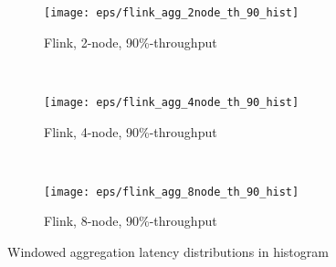 \begin{figure*}
    \begin{subfigure}[b]{0.3\textwidth}
        \texttt{[image: eps/flink\_agg\_2node\_th\_90\_hist]}

        \caption{Flink, 2-node,  90\%-throughput }
    \end{subfigure}
    ~ 
    \begin{subfigure}[b]{0.3\textwidth}
        \texttt{[image: eps/flink\_agg\_4node\_th\_90\_hist]}

        \caption{Flink, 4-node,  90\%-throughput }
    \end{subfigure}
    ~ 
    \begin{subfigure}[b]{0.3\textwidth}
        \texttt{[image: eps/flink\_agg\_8node\_th\_90\_hist]}

        \caption{Flink, 8-node,  90\%-throughput }
        
    \end{subfigure}

        \caption{Windowed aggregation latency distributions in histogram}
                \label{fig_hist_agg}
\end{figure*}

















